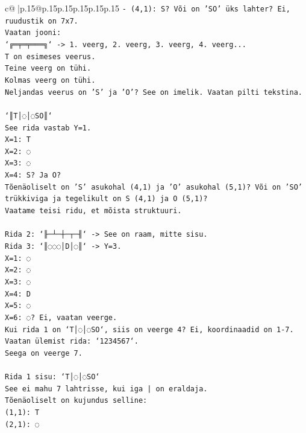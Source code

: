 \documentclass{article}
\begin{document}
{\begin{supertabular}{c@{$\;$}|p{.15\linewidth}@{}p{.15\linewidth}p{.15\linewidth}p{.15\linewidth}p{.15\linewidth}p{.15\linewidth}}
{{{\texttt{{-} (4,1): S? Või on 'SO' üks lahter? Ei, ruudustik on 7x7.} \\
\texttt{Vaatan jooni:} \\
\texttt{`╔═╤═╤═══╗` {-}> 1. veerg, 2. veerg, 3. veerg, 4. veerg...} \\
\texttt{T on esimeses veerus.} \\
\texttt{Teine veerg on tühi.} \\
\texttt{Kolmas veerg on tühi.} \\
\texttt{Neljandas veerus on 'S' ja 'O'? See on imelik. Vaatan pilti tekstina.} \\
\\ 
\texttt{`║T│◌│◌SO║`} \\
\texttt{See rida vastab Y=1.} \\
\texttt{X=1: T} \\
\texttt{X=2: ◌} \\
\texttt{X=3: ◌} \\
\texttt{X=4: S? Ja O?} \\
\texttt{Tõenäoliselt on 'S' asukohal (4,1) ja 'O' asukohal (5,1)? Või on 'SO' trükkiviga ja tegelikult on S (4,1) ja O (5,1)?} \\
\texttt{Vaatame teisi ridu, et mõista struktuuri.} \\
\\ 
\texttt{Rida 2: `╟─┴─┼─┬─╢` {-}> See on raam, mitte sisu.} \\
\texttt{Rida 3: `║◌◌◌│D│◌║` {-}> Y=3.} \\
\texttt{X=1: ◌} \\
\texttt{X=2: ◌} \\
\texttt{X=3: ◌} \\
\texttt{X=4: D} \\
\texttt{X=5: ◌} \\
\texttt{X=6: ◌? Ei, vaatan veerge.} \\
\texttt{Kui rida 1 on `T│◌│◌SO`, siis on veerge 4? Ei, koordinaadid on 1{-}7.} \\
\texttt{Vaatan ülemist rida: `1234567`.} \\
\texttt{Seega on veerge 7.} \\
\\ 
\texttt{Rida 1 sisu: `T│◌│◌SO`} \\
\texttt{See ei mahu 7 lahtrisse, kui iga | on eraldaja.} \\
\texttt{Tõenäoliselt on kujundus selline:} \\
\texttt{(1,1): T} \\
\texttt{(2,1): ◌} \\
}}}
\end{supertabular}}
\end{document}
